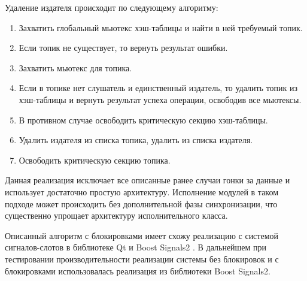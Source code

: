 Удаление издателя происходит по следующему алгоритму:

\begin{enumerate}
	\item Захватить глобальный мьютекс хэш-таблицы и найти в ней требуемый топик.
	\item Если топик не существует, то вернуть результат ошибки.
	\item Захватить мьютекс для топика.
	\item Если в топике нет слушатель и единственный издатель, то удалить топик из хэш-таблицы и вернуть результат успеха операции, освободив все мьютексы.
	\item В противном случае освободить критическую секцию хэш-таблицы.
	\item Удалить издателя из списка топика, удалить из списка издателя.
	\item Освободить критическую секцию топика.
\end{enumerate}

Данная реализация исключает все описанные ранее случаи гонки за данные и использует достаточно простую архитектуру. Исполнение модулей в таком подходе может происходить без дополнительной фазы синхронизации, что существенно упрощает архитектуру исполнительного класса.

Описанный алгоритм с блокировками имеет схожу реализацию с системой сигналов-слотов в библиотеке Qt и Boost Signals2 \cite{schaling2011boost}. В дальнейшем при тестировании производительности реализации системы без блокировок и с блокировками использовалась реализация из библиотеки Boost Signals2.

